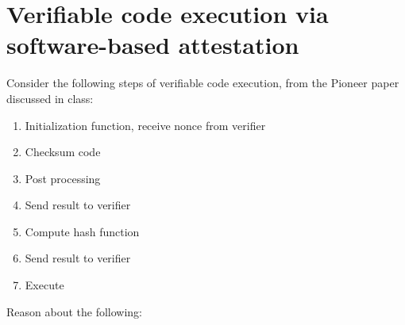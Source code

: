 \documentclass[a4paper,11pt]{article}
\begin{document}
\section{Verifiable code execution via software-based attestation}


Consider the following steps of verifiable code execution, from the Pioneer paper
discussed in class:

\begin{enumerate}
\item Initialization function, receive nonce from verifier
\item Checksum code
\item Post processing
\item Send result to verifier
\item Compute hash function
\item Send result to verifier
\item Execute
\end{enumerate}

Reason about the following:
\end{document}
